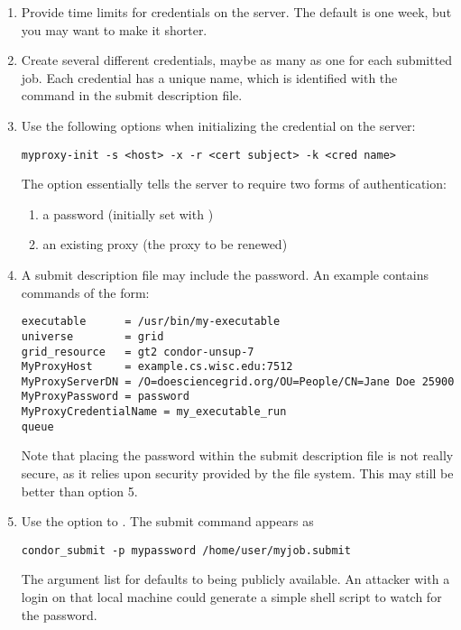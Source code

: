 \begin{enumerate}

\item{Provide time limits}
for credentials on the  server.
The default is one week, but you may want to make it shorter.

\item{Create several different  credentials},
maybe as many as one for each submitted job.
Each credential has a unique name,
which is identified with the
 command in the submit description file.

\item{Use the following options}
when initializing the credential on the  server:

\footnotesize
\begin{verbatim}
myproxy-init -s <host> -x -r <cert subject> -k <cred name>
\end{verbatim}
\normalsize

The option 
essentially tells the  server to require two forms
of authentication:
  \begin{enumerate}
  \item{a password (initially set with )}
  \item{an existing proxy (the proxy to be renewed)}
  \end{enumerate}

\item{A submit description file may include the password.}
An example contains commands of the form:
\footnotesize
\begin{verbatim}
executable      = /usr/bin/my-executable
universe        = grid
grid_resource   = gt2 condor-unsup-7
MyProxyHost     = example.cs.wisc.edu:7512
MyProxyServerDN = /O=doesciencegrid.org/OU=People/CN=Jane Doe 25900
MyProxyPassword = password
MyProxyCredentialName = my_executable_run
queue
\end{verbatim}
\normalsize
Note that placing the password within the submit description file
is not really secure,
as it relies upon security provided by the file system.
This may still be better than option 5.

\item{Use the  option to .}
The submit command appears as
\footnotesize
\begin{verbatim}
condor_submit -p mypassword /home/user/myjob.submit
\end{verbatim}
\normalsize
The argument list for  defaults to
being publicly available.
An attacker with a login on that local machine could
generate a simple shell script
to watch for the password. 

\end{enumerate}

